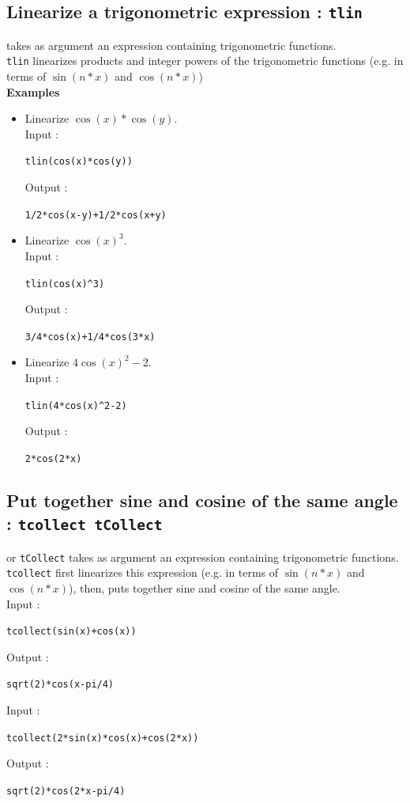 \documentclass[a4paper,11pt]{book}
\begin{document}
\subsection{Linearize  a trigonometric expression : {\tt tlin}}
 takes as argument an expression
containing trigonometric functions.\\
{\tt tlin} linearizes products and integer powers of the trigonometric
functions (e.g. in terms of $\sin(n*x)$ and  
$\cos(n*x)$)\\
{\bf Examples}
\begin{itemize}
\item Linearize $\cos(x)*\cos(y)$.\\
Input :
\begin{center}{\tt tlin(cos(x)*cos(y))}\end{center}
Output :
\begin{center}{\tt 1/2*cos(x-y)+1/2*cos(x+y)}\end{center}
\item Linearize $\cos(x)^3$.\\
Input :
\begin{center}{\tt tlin(cos(x)\verb|^|3)}\end{center}
Output :
\begin{center}{\tt 3/4*cos(x)+1/4*cos(3*x)}\end{center}
\item Linearize $4\cos(x)^2-2$.\\
Input :
\begin{center}{\tt tlin(4*cos(x)\verb|^|2-2)}\end{center}
Output :
\begin{center}{\tt 2*cos(2*x)}\end{center}
\end{itemize}

\subsection{Put together sine and cosine of the same angle : {\tt tcollect tCollect}}
 or {\tt tCollect} takes as argument 
an expression containing trigonometric functions.\\
{\tt tcollect} first linearizes this expression 
(e.g. in terms of $\sin(n*x)$ and $\cos(n*x)$),  
then, puts together sine and cosine of the same angle.\\
Input :
\begin{center}{\tt tcollect(sin(x)+cos(x))}\end{center}
Output :
\begin{center}{\tt sqrt(2)*cos(x-pi/4)}\end{center}
Input :
\begin{center}{\tt tcollect(2*sin(x)*cos(x)+cos(2*x))}\end{center}
Output :
\begin{center}{\tt sqrt(2)*cos(2*x-pi/4)}\end{center}
\end{document}
